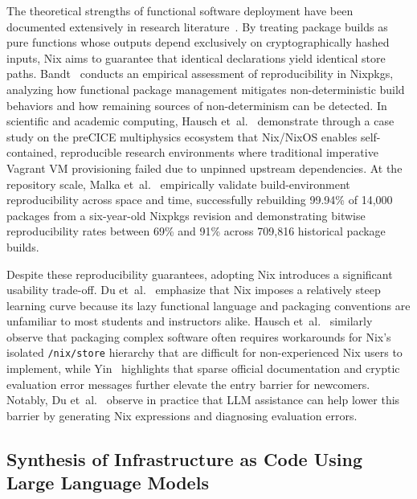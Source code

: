 The theoretical strengths of functional software deployment have been documented extensively
in research literature~\cite{functionalSoftware,dolstraNixSafePolicyFree,dolstraPurelyFunctionalSystema,dolstraNixOSPurelyFunctional2010}.
By treating package builds as pure functions whose outputs depend exclusively on
cryptographically hashed inputs, Nix aims to guarantee that identical declarations
yield identical store paths. Bandt~\cite{bandtAssessmentReproducibilityNix2025}
conducts an empirical assessment of reproducibility in Nixpkgs, analyzing how functional
package management mitigates non-deterministic build behaviors and how remaining sources
of non-determinism can be detected. In scientific and academic computing, Hausch et~al.~\cite{hauschImprovingReproducibilityScientific2025}
demonstrate through a case study on the preCICE multiphysics ecosystem that Nix/NixOS
enables self-contained, reproducible research environments where traditional imperative
Vagrant VM provisioning failed due to unpinned upstream dependencies. At the
repository scale, Malka et~al.~\cite{malkaReproducibilityBuildEnvironments2024,malkaDoesFunctionalPackage2025}
empirically validate build-environment reproducibility across space and time, successfully
rebuilding 99.94\% of 14,000 packages from a six-year-old Nixpkgs revision and
demonstrating bitwise reproducibility rates between 69\% and 91\% across 709,816
historical package builds.

Despite these reproducibility guarantees, adopting Nix introduces a significant usability
trade-off. Du et~al.~\cite{duNixRescueReproducible2026a} emphasize that Nix imposes
a relatively steep learning curve because its lazy functional language and packaging
conventions are unfamiliar to most students and instructors alike. Hausch et~al.~\cite{hauschImprovingReproducibilityScientific2025}
similarly observe that packaging complex software often requires workarounds for Nix's
isolated \texttt{/nix/store} hierarchy that are difficult for non-experienced
Nix users to implement, while Yin~\cite{OSCodeMy2024} highlights that sparse official
documentation and cryptic evaluation error messages further elevate the entry barrier
for newcomers. Notably, Du et~al.~\cite{duNixRescueReproducible2026a} observe in
practice that LLM assistance can help lower this barrier by generating Nix
expressions and diagnosing evaluation errors.

\subsection{Synthesis of Infrastructure as Code Using Large Language Models}

